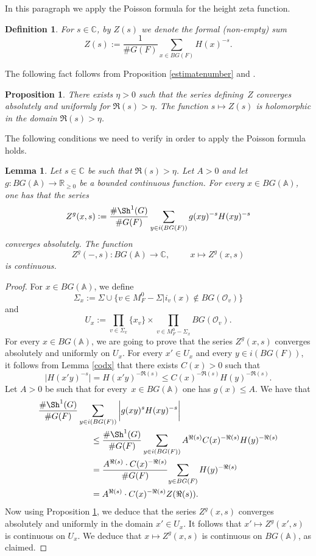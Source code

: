 \documentclass[a4paper,english,12pt]{amsart}
\newcommand{\GG}{ G}
\newcommand{\RR}{\mathbb{R}}
\newcommand{\CC}{\mathbb{C}}
\newcommand{\Ov}{\mathcal O _v}
\newcommand{\AAA}{\mathbb A}
\newcommand{\BGA}{BG(\AAA)}
\newtheorem{mydef}[equation]{Definition}
\newtheorem{lem}[equation]{Lemma}
\newtheorem{prop}[equation]{Proposition}
\numberwithin{equation}{subsection}
\begin{document}
\subsubsection{}In this paragraph we apply the Poisson formula for the height zeta function.
\begin{mydef}
For $s\in\CC$, by $Z(s)$ we denote the formal (non-empty) sum $$Z(s):=\frac{1}{\#G(F)}\sum_{x\in BG(F)}H(x)^{-s}.$$
\end{mydef}
The following fact follows from Proposition \ref{estimatenumber} and \cite[Chapter~2, Theorem 2.1]{widder}.
\begin{prop}\label{convz}
There exists $\eta>0$ such that the series defining~$Z$ converges absolutely and uniformly for $\Re(s)>\eta$. The function $s\mapsto Z(s)$ is holomorphic in the domain $\Re(s)>\eta$.
\end{prop}
The following conditions we need to verify in order to apply the Poisson formula holds.
\begin{lem}\label{condofpoiss}
Let $s\in\CC$ be such that $\Re(s)>\eta$. Let $A>0$ and let $g:BG(\AAA)\to\RR_{\geq 0}$ be a bounded continuous function. For every $x\in BG(\AAA)$, one has that the series $$Z^g(x,s):=\frac{\#\Sh^1(G)}{\# G(F)}\sum_{y\in i(BG(F))}g(xy)^{-s}H(xy)^{-s}$$ converges absolutely. The function $$Z^g(-,s):BG(\AAA)\to\CC,\hspace{1cm}x\mapsto Z^g(x,s)$$ is continuous.
\end{lem}
\begin{proof}
For $x\in \BGA$, we define $$\Sigma_x:=\Sigma\cup\{v\in M^0_F-\Sigma|i_v(x)\not\in B\GG(\Ov)\}$$ and $$U_{x}:=\prod_{v\in\Sigma_x}\{x_v\}\times\prod_{v\in M_F^0-\Sigma_x}B\GG(\Ov).$$ For every $x\in BG(\AAA)$, we are going to prove that the series $Z^g(x,s)$ converges absolutely and uniformly on $U_x$. For every $x'\in U_x$ and every $y\in i(BG(F))$, it follows from Lemma \ref{codx} that there exists $C(x)>0$ such that $$\big|H(x'y)^{-s}\big|=H(x'y)^{-\Re(s)}\leq C(x)^{-\Re(s)}H(y)^{-\Re(s)}.$$ Let $A>0$ be such that for every~$x\in BG(\AAA)$ one has $g(x)\leq A$. We have that 
\begin{align*}
\frac{\# \Sh^1(G)}{\# G(F)}\sum_{y\in i(BG(F))}\bigg|g(xy)^{s}H(xy)^{-s}\bigg|\hskip-3,7cm&\\&\leq \frac{\#\Sh^1(G)}{\# G(F)}\sum_{y\in i(BG(F))}A^{\Re(s)}C(x)^{-\Re(s)}H(y)^{-\Re(s)}\\
&=\frac{A^{\Re(s)}\cdot C(x)^{-\Re(s)}}{\# G(F)}{\sum_{y\in BG(F)}H(y)^{-\Re(s)}}\\
&=A^{\Re(s)}\cdot C(x)^{-\Re(s)}{Z(\Re(s))}.
\end{align*}
Now using Proposition \ref{convz}, we deduce that the series $Z^g(x,s)$ converges absolutely and uniformly in the domain $x'\in U_x$. It follows that $x'\mapsto Z^g(x',s)$ is continuous on $U_x$. We deduce that $x\mapsto Z^g(x,s)$ is continuous on $BG(\AAA)$, as claimed. 
\end{proof}
\end{document}

